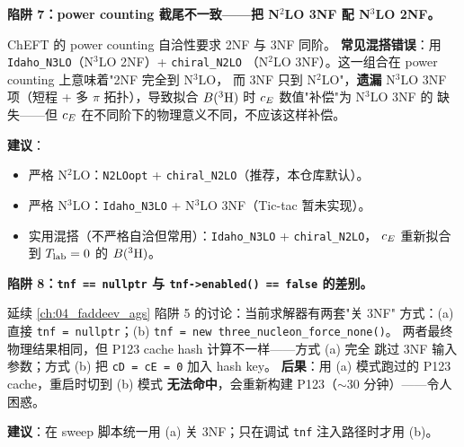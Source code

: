 \begin{pitfallbox}[label={pit:ch15-truncation}]
\textbf{陷阱 7：power counting 截尾不一致——把 N\(^2\)LO 3NF 配 N\(^3\)LO 2NF。}

ChEFT 的 power counting 自洽性要求 2NF 与 3NF 同阶。
\textbf{常见混搭错误}：用 \texttt{Idaho\_N3LO}（N\(^3\)LO 2NF）+ \texttt{chiral\_N2LO}
（N\(^2\)LO 3NF）。这一组合在 power counting 上意味着"2NF 完全到 N\(^3\)LO，
而 3NF 只到 N\(^2\)LO"，\textbf{遗漏} N\(^3\)LO 3NF 项（短程 + 多 \(\pi\)
拓扑），导致拟合 \(B(^3{\rm H})\) 时 \(c_E\) 数值"补偿"为 N\(^3\)LO 3NF 的
缺失——但 \(c_E\) 在不同阶下的物理意义不同，不应该这样补偿。

\textbf{建议}：
\begin{itemize}
\item 严格 N\(^2\)LO：\texttt{N2LOopt} + \texttt{chiral\_N2LO}（推荐，本仓库默认）。
\item 严格 N\(^3\)LO：\texttt{Idaho\_N3LO} + N\(^3\)LO 3NF（Tic-tac 暂未实现）。
\item 实用混搭（不严格自洽但常用）：\texttt{Idaho\_N3LO} + \texttt{chiral\_N2LO}，
      \(c_E\) 重新拟合到 \({T_{\text{lab}}} = 0\) 的 \(B(^3{\rm H})\)。
\end{itemize}
\end{pitfallbox}

\begin{pitfallbox}[label={pit:ch15-tnf-nullptr}]
\textbf{陷阱 8：\texttt{tnf == nullptr} 与 \texttt{tnf->enabled() == false} 的差别。}

延续 \cref{ch:04_faddeev_ags} 陷阱 5 的讨论：当前求解器有两套"关 3NF"
方式：(a) 直接 \texttt{tnf = nullptr}；(b) \texttt{tnf =
new three\_nucleon\_force\_none()}。
两者最终物理结果相同，但 P123 cache hash 计算不一样——方式 (a) 完全
跳过 3NF 输入参数；方式 (b) 把 \texttt{cD = cE = 0} 加入 hash key。
\textbf{后果}：用 (a) 模式跑过的 P123 cache，重启时切到 (b) 模式
\textbf{无法命中}，会重新构建 P123（\(\sim 30\) 分钟）——令人困惑。

\textbf{建议}：在 sweep 脚本统一用 (a) 关 3NF；只在调试 \texttt{tnf}
注入路径时才用 (b)。
\end{pitfallbox}

